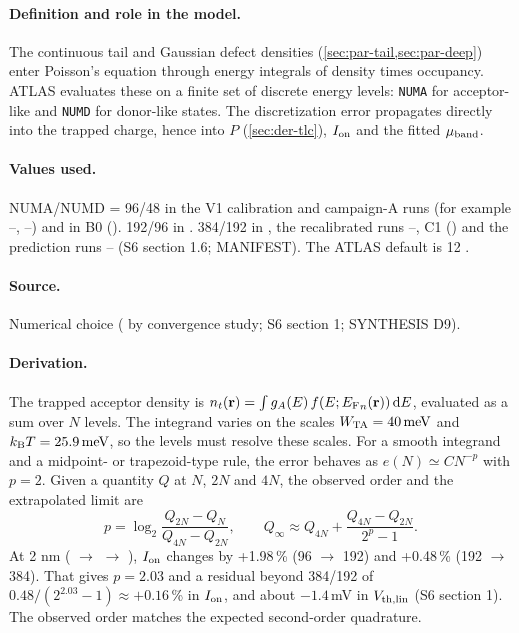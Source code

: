 \paragraph{Definition and role in the model.}
The continuous tail and Gaussian defect densities (\cref{sec:par-tail,sec:par-deep}) enter Poisson's equation through energy integrals of density times occupancy. ATLAS evaluates these on a finite set of discrete energy levels: \texttt{NUMA} for acceptor-like and \texttt{NUMD} for donor-like states. The discretization error propagates directly into the trapped charge, hence into $P$ (\cref{sec:der-tlc}), $I_{\mathrm{on}}$ and the fitted $\mu_{\mathrm{band}}$.

\paragraph{Values used.}
NUMA/NUMD = 96/48 in the V1 calibration and campaign-A runs (for example --, --) and in B0 (). 192/96 in . 384/192 in , the recalibrated runs --, C1 () and the prediction runs -- (S6 section 1.6; MANIFEST). The ATLAS default is 12 \citep[p.~1168]{AtlasManual}.

\paragraph{Source.}
Numerical choice ( by convergence study; S6 section 1; SYNTHESIS D9).

\paragraph{Derivation.}
\begin{derivation}
The trapped acceptor density is $n_t(\mathbf{r})=\int g_A(E)\,f\!\left(E;{E_{\mathrm{F}}}_{n}(\mathbf{r})\right)\mathrm{d}E$, evaluated as a sum over $N$ levels. The integrand varies on the scales $W_{\mathrm{TA}}=\SI{40}{meV}$ and $k_{\mathrm{B}}T=\SI{25.9}{meV}$, so the levels must resolve these scales. For a smooth integrand and a midpoint- or trapezoid-type rule, the error behaves as $e(N)\simeq C N^{-p}$ with $p=2$. Given a quantity $Q$ at $N$, $2N$ and $4N$, the observed order and the extrapolated limit are
\begin{equation}
  p=\log_2\frac{Q_{2N}-Q_{N}}{Q_{4N}-Q_{2N}},\qquad
  Q_\infty \approx Q_{4N}+\frac{Q_{4N}-Q_{2N}}{2^{p}-1}.
  \label{eq:d2-richardson}
\end{equation}
At 2 nm ( $\rightarrow$  $\rightarrow$ ), $I_{\mathrm{on}}$ changes by +1.98\,\% (96 $\rightarrow$ 192) and +0.48\,\% (192 $\rightarrow$ 384). That gives $p=2.03$ and a residual beyond 384/192 of $0.48/(2^{2.03}-1)\approx+0.16$\,\% in $I_{\mathrm{on}}$, and about $-1.4$\,mV in $V_{\mathrm{th,lin}}$ (S6 section 1). The observed order matches the expected second-order quadrature.
\end{derivation}

